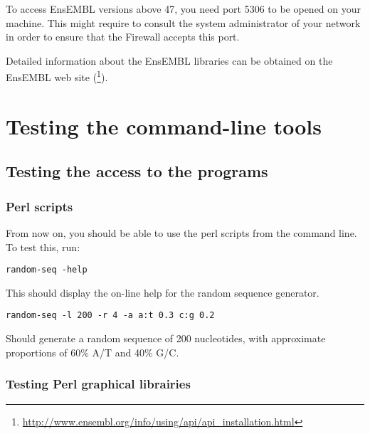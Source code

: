 \documentclass{book}
\begin{document}
To access EnsEMBL versions above 47, you need port 5306 to be opened
on your machine. This might require to consult the system
administrator of your network in order to ensure that the Firewall
accepts this port.

Detailed information about the EnsEMBL libraries can be obtained on
the EnsEMBL web site
(\footnote{\url{http://www.ensembl.org/info/using/api/api\_installation.html}}).








\chapter{Testing the command-line tools}

\section{Testing the access to the programs}

\subsection{Perl scripts}

From now on, you should be able to use the perl scripts from the
command line. To test this, run:

\begin{footnotesize}
\begin{verbatim}
random-seq -help
\end{verbatim}
\end{footnotesize}


This should display the on-line help for the random sequence
generator.

\begin{footnotesize}
\begin{verbatim}
random-seq -l 200 -r 4 -a a:t 0.3 c:g 0.2
\end{verbatim}
\end{footnotesize}

Should generate a random sequence of 200 nucleotides, with approximate
proportions of 60\% A/T and 40\% G/C.


\subsection{Testing Perl graphical librairies}
\end{document}
